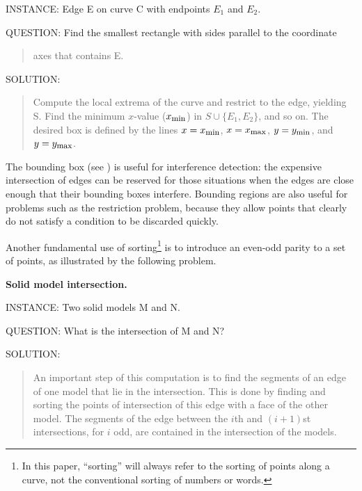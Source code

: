 INSTANCE: Edge E on curve C with endpoints $E_{1}$ and $E_{2}$.

QUESTION: Find the smallest rectangle with sides parallel to the coordinate
\begin{quote}
axes that contains E.
\end{quote}

SOLUTION: 
\begin{quote}
Compute the local extrema of the curve and restrict to the edge, yielding S.
Find the minimum $x$-value ($x_{\mbox{\footnotesize{min}}}$) 
in $S \cup \{E_{1},E_{2}\}$, and so on.
The desired box is defined by the lines $x = x_{\mbox{\footnotesize{min}}}$, 
$x = x_{\mbox{\footnotesize{max}}}$, $y = y_{\mbox{\footnotesize{min}}}$, 
and $y = y_{\mbox{\footnotesize{max}}}$.
\end{quote}
\vspace{.25in}
%
\noindent The bounding box (see \cite[p. 372]{NS}) is useful for interference detection: 
the expensive intersection of edges can be reserved for those situations when the edges
are close enough that their bounding boxes interfere.
Bounding regions are also useful for problems such as the restriction problem, 
because they allow points that clearly do not satisfy a condition to be discarded
quickly.

Another fundamental use of sorting\footnote{In this paper, ``sorting'' will always
	refer to the sorting of points along a curve, not the conventional sorting of 
	numbers or words.} 
is to introduce an even-odd parity to a
set of points, as illustrated by the following problem.

\vspace{.2in}

{\bf Solid model intersection.}

INSTANCE: Two solid models M and N.

QUESTION: What is the intersection of M and N?

SOLUTION: 
\begin{quote}
An important step of this computation
is to find the segments of an edge of one model that lie in the intersection.
This is done by finding and sorting the points of intersection 
of this edge with a face of the other model. 
The segments of the edge between the $i$th and $(i+1)$st intersections,
for $i$ odd, are contained in the intersection of the models.
\end{quote}

\vspace{.2in}

